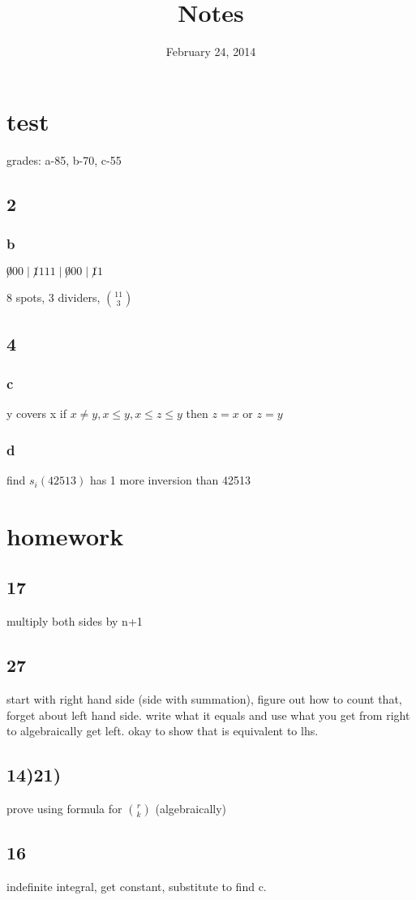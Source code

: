 \documentclass{article}
\begin{document}
\title{Notes}
\date{February 24, 2014}
\maketitle
\section*{test}
grades: a-85, b-70, c-55
\subsection*{2}
\subsubsection*{b}
$\not000\mid\not1111\mid\not000\mid\not11$

8 spots, 3 dividers, $\binom{11}{3}$
\subsection*{4}
\subsubsection*{c}
y covers x if $x\ne y, x\le y, x\le z\le y$ then $z=x$ or $z=y$ 
\subsubsection*{d}
find $s_i(42513)$ has 1 more inversion than 42513
\section*{homework}
\subsection*{17}
multiply  both sides by n+1
\subsection*{27}
start with right hand side (side with summation), figure out how to count that, forget about left hand side. write what it equals and use what you get from right to algebraically get left. okay to show that is equivalent to lhs.
\subsection*{14)21)}
prove using formula for $\binom{r}{k}$ (algebraically)
\subsection*{16}
indefinite integral, get constant, substitute to find c.
\end{document}
